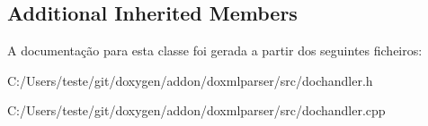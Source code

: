 \subsection*{Additional Inherited Members}


A documentação para esta classe foi gerada a partir dos seguintes ficheiros\-:\begin{DoxyCompactItemize}
\item 
C\-:/\-Users/teste/git/doxygen/addon/doxmlparser/src/dochandler.\-h\item 
C\-:/\-Users/teste/git/doxygen/addon/doxmlparser/src/dochandler.\-cpp\end{DoxyCompactItemize}
